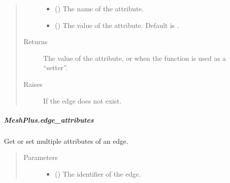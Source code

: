 \documentclass[letterpaper,10pt,english]{sphinxmanual}
\begin{document}
\begin{fulllineitems}
\begin{fulllineitems}
\begin{quote}
\begin{description}
\begin{itemize}
\item {} 
 () \textendash{} The name of the attribute.

\item {} 
 () \textendash{} The value of the attribute.
Default is .

\end{itemize}

\item[{Returns}] \leavevmode
{} \textendash{} The value of the attribute, or  when the function is used as a “setter”.

\item[{Raises}] \leavevmode
{} \textendash{} If the edge does not exist.

\end{description}\end{quote}

\end{fulllineitems}



\subparagraph{MeshPlus.edge\_attributes}
\label{\detokenize{api/generated/directional_clustering.mesh.MeshPlus.edge_attributes:meshplus-edge-attributes}}\label{\detokenize{api/generated/directional_clustering.mesh.MeshPlus.edge_attributes::doc}}

\begin{fulllineitems}
\label{\detokenize{api/generated/directional_clustering.mesh.MeshPlus.edge_attributes:directional_clustering.mesh.MeshPlus.edge_attributes}}
Get or set multiple attributes of an edge.
\begin{quote}\begin{description}
\item[{Parameters}] \leavevmode\begin{itemize}
\item {} 
 () \textendash{} The identifier of the edge.


\end{itemize}
\end{description}
\end{quote}
\end{fulllineitems}
\end{fulllineitems}
\end{document}
